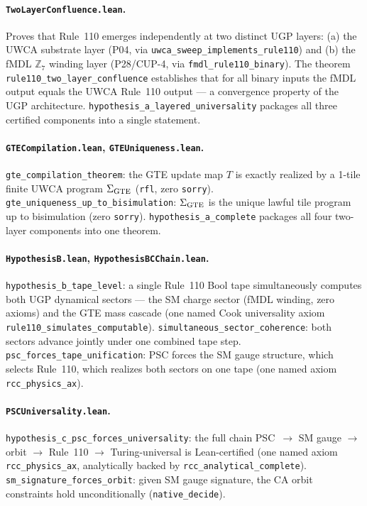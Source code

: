 \documentclass[11pt]{article}
\begin{document}
\paragraph{\texttt{TwoLayerConfluence.lean}.}
Proves that Rule~110 emerges independently at two distinct UGP layers:
(a) the UWCA substrate layer (P04, via \texttt{uwca\_sweep\_implements\_rule110}) and
(b) the fMDL $\mathbb{Z}_7$ winding layer (P28/CUP-4, via \texttt{fmdl\_rule110\_binary}).
The theorem \texttt{rule110\_two\_layer\_confluence} establishes that for all binary inputs the fMDL output equals the UWCA Rule~110 output — a convergence property of the UGP architecture.
\texttt{hypothesis\_a\_layered\_universality} packages all three certified components into a single statement.

\paragraph{\texttt{GTECompilation.lean}, \texttt{GTEUniqueness.lean}.}
\texttt{gte\_compilation\_theorem}: the GTE update map $T$ is exactly realized by a 1-tile finite UWCA program $\Sigma_{\rm GTE}$ (\texttt{rfl}, zero \texttt{sorry}).
\texttt{gte\_uniqueness\_up\_to\_bisimulation}: $\Sigma_{\rm GTE}$ is the unique lawful tile program up to bisimulation (zero \texttt{sorry}).
\texttt{hypothesis\_a\_complete} packages all four two-layer components into one theorem.

\paragraph{\texttt{HypothesisB.lean}, \texttt{HypothesisBCChain.lean}.}
\texttt{hypothesis\_b\_tape\_level}: a single Rule~110 Bool tape simultaneously computes both UGP dynamical sectors --- the SM charge sector (fMDL winding, zero axioms) and the GTE mass cascade (one named Cook universality axiom \texttt{rule110\_simulates\_computable}).
\texttt{simultaneous\_sector\_coherence}: both sectors advance jointly under one combined tape step.
\texttt{psc\_forces\_tape\_unification}: PSC forces the SM gauge structure, which selects Rule~110, which realizes both sectors on one tape (one named axiom \texttt{rcc\_physics\_ax}).

\paragraph{\texttt{PSCUniversality.lean}.}
\texttt{hypothesis\_c\_psc\_forces\_universality}: the full chain PSC~$\to$ SM gauge $\to$ orbit $\to$ Rule~110 $\to$ Turing-universal is Lean-certified (one named axiom \texttt{rcc\_physics\_ax}, analytically backed by \texttt{rcc\_analytical\_complete}).
\texttt{sm\_signature\_forces\_orbit}: given SM gauge signature, the CA orbit constraints hold unconditionally (\texttt{native\_decide}).
\end{document}
